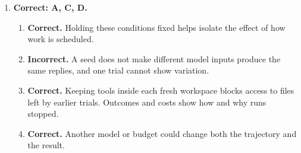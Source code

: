 \begin{enumerate}[start=51,itemsep=0.7\baselineskip]
\item[{\hyperref[exercise:60]{60.}}] \begin{minipage}[t]{\linewidth}
\textbf{Correct: A, C, D.}
\begin{enumerate}[label=\textnormal{(\Alph*)},leftmargin=*,itemsep=0pt]
\item \textbf{Correct.} Holding these conditions fixed helps isolate the effect of how work is scheduled.
\item \textbf{Incorrect.} A seed does not make different model inputs produce the same replies, and one trial cannot show variation.
\item \textbf{Correct.} Keeping tools inside each fresh workspace blocks access to files left by earlier trials. Outcomes and costs show how and why runs stopped.
\item \textbf{Correct.} Another model or budget could change both the trajectory and the result.
\end{enumerate}
\end{minipage}

\end{enumerate}

